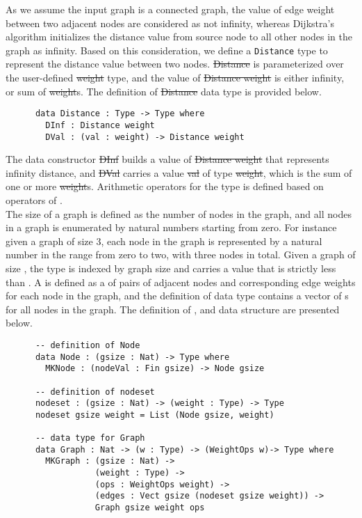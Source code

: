 As we assume the input graph is a connected graph, the value of edge weight between two adjacent nodes are considered as not infinity, whereas Dijkstra's algorithm initializes the distance value from source node to all other nodes in the graph as infinity. Based on this consideration, we define a \texttt{Distance} type to represent the distance value between two nodes. \st{Distance} is parameterized over the user-defined \st{weight} type, and the value of \st{Distance weight} is either infinity, or sum of \st{weight}s. The definition of \st{Distance} data type is provided below. 
\begin{lstlisting}
      data Distance : Type -> Type where
        DInf : Distance weight
        DVal : (val : weight) -> Distance weight
\end{lstlisting}

The data constructor \st{DInf} builds a value of \st{Distance weight} that represents infinity distance, and \st{DVal} carries a value \st{val} of type \st{weight}, which is the sum of one or more \st{weight}s. Arithmetic operators for the  type is defined based on operators of .
\\

The size of a graph is defined as the number of nodes in the graph, and all nodes in a graph is enumerated by natural numbers starting from zero. For instance given a graph of size 3, each node in the graph is represented by a natural number in the range from zero to two, with three nodes in total. Given a graph  of size , the  type is indexed by graph size  and carries a value that is strictly less than . A  is defined as a  of pairs of adjacent nodes and corresponding edge weights for each node in the graph, and the definition of  data type contains a vector of s for all nodes in the graph. The definition of ,  and  data structure are presented below. 
\begin{lstlisting}
      -- definition of Node
      data Node : (gsize : Nat) -> Type where
        MKNode : (nodeVal : Fin gsize) -> Node gsize

      -- definition of nodeset
      nodeset : (gsize : Nat) -> (weight : Type) -> Type
      nodeset gsize weight = List (Node gsize, weight)

      -- data type for Graph
      data Graph : Nat -> (w : Type) -> (WeightOps w)-> Type where
        MKGraph : (gsize : Nat) ->
                  (weight : Type) ->
                  (ops : WeightOps weight) ->
                  (edges : Vect gsize (nodeset gsize weight)) ->
                  Graph gsize weight ops
\end{lstlisting}

